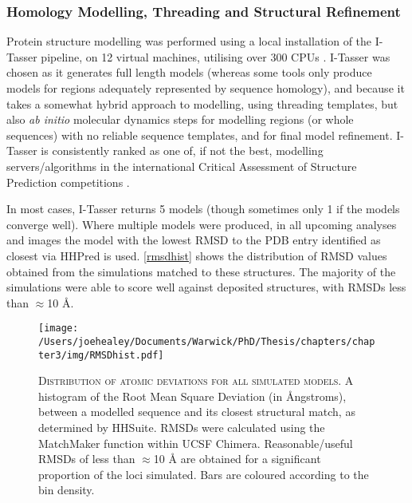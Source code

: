 \subsubsection{Homology Modelling, Threading and Structural Refinement}
Protein structure modelling was performed using a local installation of the I-Tasser pipeline, on 12 virtual machines, utilising over 300 CPUs \citep{Yang2014, Roy2010, Zhang2008}. I-Tasser was chosen as it generates full length models (whereas some tools only produce models for regions adequately represented by sequence homology), and because it takes a somewhat hybrid approach to modelling, using threading templates, but also \emph{ab initio} molecular dynamics steps for modelling regions (or whole sequences) with no reliable sequence templates, and for final model refinement. I-Tasser is consistently ranked as one of, if not the best, modelling servers/algorithms in the international Critical Assessment of Structure Prediction competitions \citep{Moult2015}.

In most cases, I-Tasser returns 5 models (though sometimes only 1 if the models converge well). Where multiple models were produced, in all upcoming analyses and images the model with the lowest RMSD to the PDB entry identified as closest via HHPred is used. \vref{rmsdhist} shows the distribution of RMSD values obtained from the simulations matched to these structures. The majority of the simulations were able to score well against deposited structures, with RMSDs less than $\approx$10 \AA.

\begin{figure}[h]
\centering
{}
\texttt{[image: /Users/joehealey/Documents/Warwick/PhD/Thesis/chapters/chapter3/img/RMSDhist.pdf]}
	\captionsetup{singlelinecheck=off, justification=justified, font=footnotesize, aboveskip=10pt}
	\caption[I-Tasser model accuracy distribution - RMSD]{\textsc{\normalsize Distribution of atomic deviations for all simulated models.}\vspace{0.1cm} \newline A histogram of the Root Mean Square Deviation (in \AA{}ngstroms), between a modelled sequence and its closest structural match, as determined by HHSuite. RMSDs were calculated using the MatchMaker function within UCSF Chimera. Reasonable/useful RMSDs of less than $\approx$10 \AA{} are obtained for a significant proportion of the loci simulated. Bars are coloured according to the bin density.}
	\label{rmsdhist}
\end{figure}

